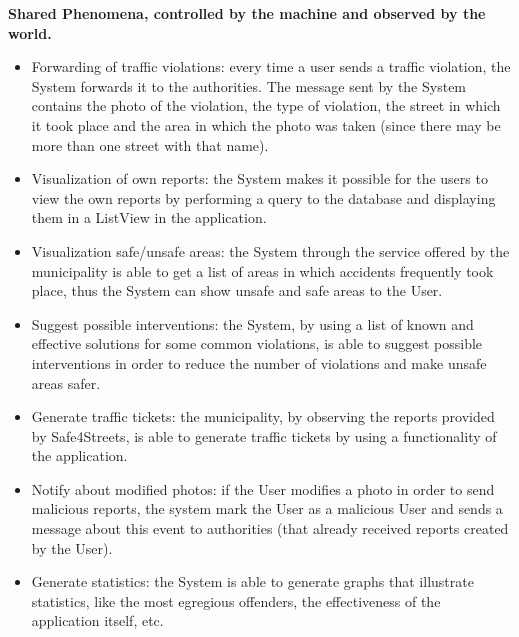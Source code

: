     \noindent\textbf{Shared Phenomena, controlled by the machine and observed by the world.}
      \begin{itemize}
          \item Forwarding of traffic violations: every time a user sends a traffic violation, the System forwards it to the authorities. The message sent by the System contains the photo of the violation, the type of violation, the street in which it took place and the area in which the photo was taken (since there may be more than one street with that name).
          \item Visualization of own reports: the System makes it possible for the users to view the own reports by performing a query to the database and displaying them in a ListView in the application.
          \item Visualization safe/unsafe areas: the System through the service offered by the municipality is able to get a list of areas in which accidents frequently took place, thus the System can show unsafe and safe areas to the User.
          \item Suggest possible interventions: the System,  by using a list of known and effective solutions for some common violations, is able to suggest possible interventions in order to reduce the number of violations and make unsafe areas safer.
          \item Generate traffic tickets: the municipality, by observing the reports provided by Safe4Streets, is able to  generate traffic tickets by using a functionality of the application.
          \item Notify about modified photos: if the User modifies a photo in order to send malicious reports, the system mark the User as a malicious User and sends a message about this event to authorities (that already received reports created by the User). 
          \item Generate statistics: the System is able to generate graphs that illustrate statistics, like the most egregious offenders, the effectiveness of the application itself, etc.
          \end{itemize}
          

\vspace{40px}      


